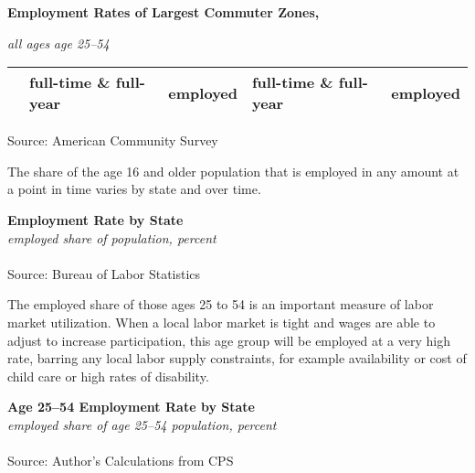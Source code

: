 \documentclass{report}
\begin{document}
{\begin{minipage}{0.24\textwidth}
\footnotesize 
\end{minipage}
\newpage
\begin{minipage}{0.76\textwidth} 
\normalsize \textbf{Employment Rates of Largest Commuter Zones, }
\vspace{-1mm}

\footnotesize \hspace{42mm} \textit{all ages} \hspace{20mm} \textit{age 25--54}\\
 \setlength{\tabcolsep}{3.1pt} \color{black!90}
	{\renewcommand{\arraystretch}{1.55}
		\begin{tabular}{p{24mm} R{15mm} R{15mm} R{15mm} R{15mm}}
		 	& full-time \& full-year & employed & full-time \& full-year & employed \\
			  \hline
		\end{tabular}}	
\vspace{-2mm}

\footnotesize{Source: American Community Survey}
\vspace{6mm}

\small The share of the age 16 and older population that is employed in any amount at a point in time varies by state and over time. 
\end{minipage}
\vspace{2mm}

\normalsize \textbf{Employment Rate by State}\\
\footnotesize{\textit{employed share of population, percent}}\\
\vspace{-2mm}
\hspace{-8mm}  \\
\footnotesize{Source: Bureau of Labor Statistics}
\newpage
\begin{minipage}{0.76\textwidth} 
\small The employed share of those ages 25 to 54 is an important measure of labor market utilization. When a local labor market is tight and wages are able to adjust to increase participation, this age group will be employed at a very high rate, barring any local labor supply constraints, for example availability or cost of child care or high rates of disability. 
\end{minipage}

\normalsize \textbf{Age 25--54 Employment Rate by State}\\
\footnotesize{\textit{employed share of age 25--54 population, percent}}\\
\vspace{-2mm}
\hspace{-8mm}  \\
\footnotesize{Source: Author's Calculations from CPS}
\vspace{12mm}

}
\end{document}
